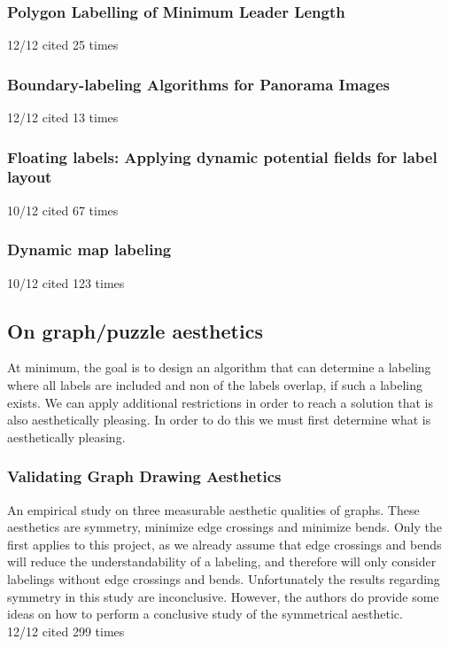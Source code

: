 \documentclass[a4paper]{article}
\begin{document}
\subsubsection{Polygon Labelling of Minimum Leader Length \cite{Bekos:2006:PLM:1151903.1151906}}
12/12 cited 25 times

\subsubsection{Boundary-labeling Algorithms for Panorama Images \cite{Gemsa:2011:BAP:2093973.2094012}}
12/12 cited 13 times

\subsubsection{Floating labels: Applying dynamic potential fields for label layout \cite{hartmann2004floating}}
10/12 cited 67 times

\subsubsection{Dynamic map labeling \cite{been2006dynamic}}
10/12 cited 123 times

\subsection{On graph/puzzle aesthetics}
At minimum, the goal is to design an algorithm that can determine a labeling where all labels are included and non of the labels overlap, if such a labeling exists. We can apply additional restrictions in order to reach a solution that is also aesthetically pleasing. In order to do this we must first determine what is aesthetically pleasing.\\

\subsubsection{Validating Graph Drawing Aesthetics \cite{purchase1995validating}}
An empirical study on three measurable aesthetic qualities of graphs. These aesthetics are symmetry, minimize edge crossings and minimize bends. Only the first applies to this project, as we already assume that edge crossings and bends will reduce the understandability of a labeling, and therefore will only consider labelings without edge crossings and bends. Unfortunately the results regarding symmetry in this study are inconclusive. However, the authors do provide some ideas on how to perform a conclusive study of the symmetrical aesthetic.\\
12/12 cited 299 times
\end{document}
